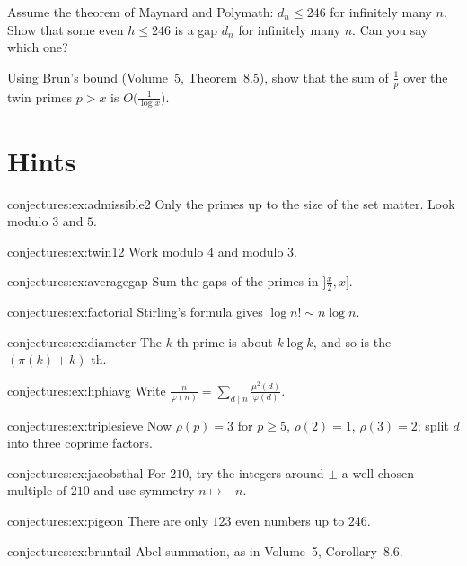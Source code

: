 \begin{exercise}[$\star$]\label{conjectures:ex:pigeon}
Assume the theorem of Maynard and Polymath: $d_n\le246$ for infinitely many $n$. Show that some even $h\le246$ is a gap $d_n$ for infinitely many $n$.
Can you say which one?
\end{exercise}

\begin{exercise}[$\star\star$]\label{conjectures:ex:bruntail}
Using Brun's bound (Volume~5, Theorem~8.5), show that the sum of $\frac1p$ over the twin primes $p>x$ is $O\bigl(\frac1{\log x}\bigr)$.
\end{exercise}

\section{Hints}

\begin{hint}{conjectures:ex:admissible2}
Only the primes up to the size of the set matter. Look modulo $3$ and $5$.
\end{hint}
\begin{hint}{conjectures:ex:twin12}
Work modulo $4$ and modulo $3$.
\end{hint}
\begin{hint}{conjectures:ex:averagegap}
Sum the gaps of the primes in $]\frac x2,x]$.
\end{hint}
\begin{hint}{conjectures:ex:factorial}
Stirling's formula gives $\log n!\sim n\log n$.
\end{hint}
\begin{hint}{conjectures:ex:diameter}
The $k$-th prime is about $k\log k$, and so is the $(\pi(k)+k)$-th.
\end{hint}
\begin{hint}{conjectures:ex:hphiavg}
Write $\frac n{\varphi(n)}=\sum_{d\mid n}\frac{\mu^2(d)}{\varphi(d)}$.
\end{hint}
\begin{hint}{conjectures:ex:triplesieve}
Now $\rho(p)=3$ for $p\ge5$, $\rho(2)=1$, $\rho(3)=2$; split $d$ into three coprime factors.
\end{hint}
\begin{hint}{conjectures:ex:jacobsthal}
For $210$, try the integers around $\pm$ a well-chosen multiple of $210$ and use symmetry $n\mapsto-n$.
\end{hint}
\begin{hint}{conjectures:ex:pigeon}
There are only $123$ even numbers up to $246$.
\end{hint}
\begin{hint}{conjectures:ex:bruntail}
Abel summation, as in Volume~5, Corollary~8.6.
\end{hint}

